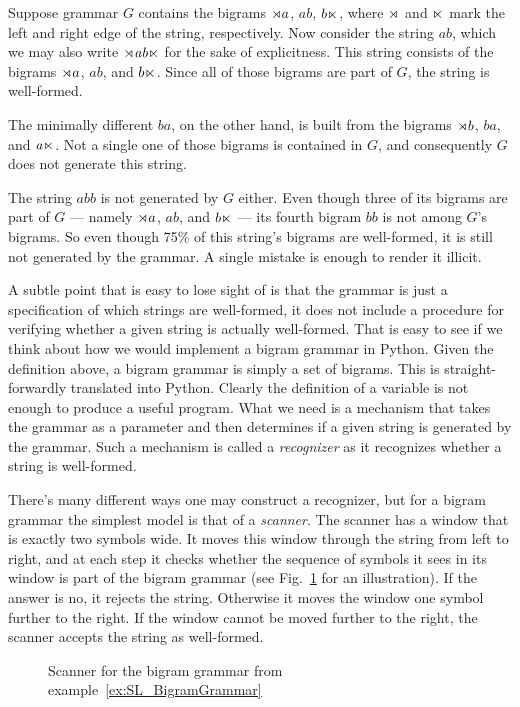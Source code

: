 \begin{examplebox}
    \label{ex:SL_BigramGrammar}%
    Suppose grammar $G$ contains the bigrams $\rtimes a$, $\mathit{ab}$, $b \ltimes$, where $\rtimes$ and $\ltimes$ mark the left and right edge of the string, respectively.
    Now consider the string $\mathit{ab}$, which we may also write $\rtimes \mathit{ab} \ltimes$ for the sake of explicitness.
    This string consists of the bigrams $\rtimes a$, $\mathit{ab}$, and $b \ltimes$.
    Since all of those bigrams are part of $G$, the string is well-formed. 

    The minimally different $\mathit{ba}$, on the other hand, is built from the bigrams $\rtimes b$, $\mathit{ba}$, and $\mathit{a \ltimes}$.
    Not a single one of those bigrams is contained in $G$, and consequently $G$ does not generate this string.

    The string $\mathit{abb}$ is not generated by $G$ either.
    Even though three of its bigrams are part of $G$ --- namely $\rtimes a$, $\mathit{ab}$, and $b \ltimes$ --- its fourth bigram $\mathit{bb}$ is not among $G$'s bigrams.
    So even though 75\% of this string's bigrams are well-formed, it is still not generated by the grammar.
    A single mistake is enough to render it illicit.
\end{examplebox}

A subtle point that is easy to lose sight of is that the grammar is just a specification of which strings are well-formed, it does not include a procedure for verifying whether a given string is actually well-formed.
That is easy to see if we think about how we would implement a bigram grammar in Python.
Given the definition above, a bigram grammar is simply a set of bigrams.
This is straight-forwardly translated into Python.
%
%
Clearly the definition of a variable is not enough to produce a useful program.
What we need is a mechanism that takes the grammar as a parameter and then determines if a given string is generated by the grammar.
Such a mechanism is called a \emph{recognizer} as it recognizes whether a string is well-formed.

There's many different ways one may construct a recognizer, but for a bigram grammar the simplest model is that of a \emph{scanner}.
The scanner has a window that is exactly two symbols wide.
It moves this window through the string from left to right, and at each step it checks whether the sequence of symbols it sees in its window is part of the bigram grammar (see Fig.~\ref{fig:SL_Scanner} for an illustration).
If the answer is no, it rejects the string.
Otherwise it moves the window one symbol further to the right.
If the window cannot be moved further to the right, the scanner accepts the string as well-formed.
%
\begin{figure}[tbph]
    
\caption{Scanner for the bigram grammar from example~\ref{ex:SL_BigramGrammar}}
\label{fig:SL_Scanner}
\end{figure}


